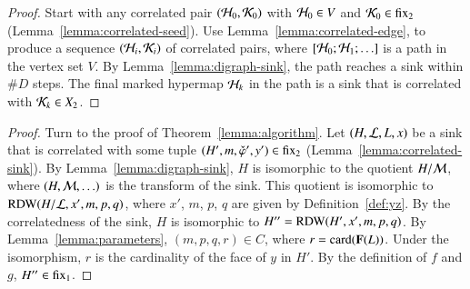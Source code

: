 \begin{proof} Start with any  correlated pair $({\cal
    H}_0,{\cal K}_0)$ with ${\cal H}_0\in V$ and ${\cal K}_0\in {\operatorname{fix}}_2$ 
  (Lemma~\ref{lemma:correlated-seed}).  Use
  Lemma~\ref{lemma:correlated-edge}, to produce a sequence $({\cal
    H}_i,{\cal K}_i)$ of correlated pairs, where $[{\cal H}_0;{\cal
    H}_1;\ldots]$ is a path in the vertex set $V$.  By Lemma~\ref{lemma:digraph-sink},
  the path reaches a sink within $\#D$ steps.  The final marked
  hypermap ${\cal H}_k$ in the path is a sink that is correlated with
  ${\cal K}_k\in X_2$.
\end{proof}

\begin{proof} Turn to the proof of Theorem~\ref{lemma:algorithm}.  Let
  $(H,{\cal L},L,x)$ be a sink that is correlated with some tuple
  $(H',m,\check\varphi',y')\in {\operatorname{fix}}_2$
  (Lemma~\ref{lemma:correlated-sink}).  By
  Lemma~\ref{lemma:digraph-sink}, $H$ is isomorphic to the quotient
  $H/{\cal M}$, where $(H,{\cal M},\ldots)$ is the transform of the
  sink.  This quotient is isomorphic to ${\operatorname{RDW}}(H/{\cal
    L},x',m,p,q)$, where $x'$, $m$, $p$, $q$ are given by
  Definition~\ref{def:yz}.  By the correlatedness of the sink, $H$ is
  isomorphic to $H''={\operatorname{RDW}}(H',x',m,p,q)$.  By
  Lemma~\ref{lemma:parameters}, $(m,p,q,r)\in C$, where
  $r={\operatorname{card}}({\mathbf F}(L))$.  Under the isomorphism, $r$ is the cardinality
  of the face of $y$ in $H'$.  By the definition of $f$ and $g$,
  $H''\in {\operatorname{fix}}_1$.
\end{proof}





